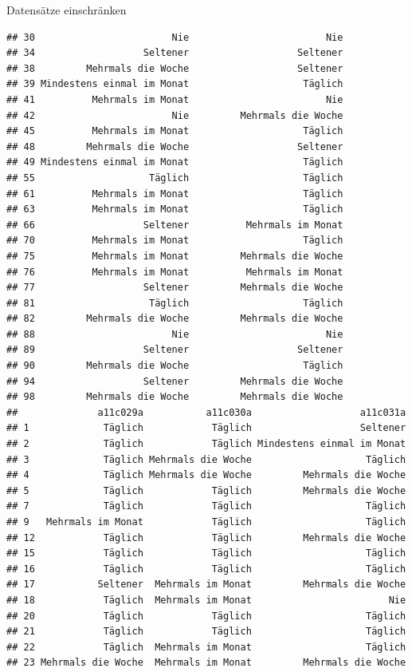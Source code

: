 \documentclass[ignorenonframetext,]{beamer}
\begin{document}
\begin{frame}[fragile]{Datensätze einschränken}
\begin{verbatim}
## 30                        Nie                        Nie
## 34                   Seltener                   Seltener
## 38         Mehrmals die Woche                   Seltener
## 39 Mindestens einmal im Monat                    Täglich
## 41          Mehrmals im Monat                        Nie
## 42                        Nie         Mehrmals die Woche
## 45          Mehrmals im Monat                    Täglich
## 48         Mehrmals die Woche                   Seltener
## 49 Mindestens einmal im Monat                    Täglich
## 55                    Täglich                    Täglich
## 61          Mehrmals im Monat                    Täglich
## 63          Mehrmals im Monat                    Täglich
## 66                   Seltener          Mehrmals im Monat
## 70          Mehrmals im Monat                    Täglich
## 75          Mehrmals im Monat         Mehrmals die Woche
## 76          Mehrmals im Monat          Mehrmals im Monat
## 77                   Seltener         Mehrmals die Woche
## 81                    Täglich                    Täglich
## 82         Mehrmals die Woche         Mehrmals die Woche
## 88                        Nie                        Nie
## 89                   Seltener                   Seltener
## 90         Mehrmals die Woche                    Täglich
## 94                   Seltener         Mehrmals die Woche
## 98         Mehrmals die Woche         Mehrmals die Woche
##              a11c029a           a11c030a                   a11c031a
## 1             Täglich            Täglich                   Seltener
## 2             Täglich            Täglich Mindestens einmal im Monat
## 3             Täglich Mehrmals die Woche                    Täglich
## 4             Täglich Mehrmals die Woche         Mehrmals die Woche
## 5             Täglich            Täglich         Mehrmals die Woche
## 7             Täglich            Täglich                    Täglich
## 9   Mehrmals im Monat            Täglich                    Täglich
## 12            Täglich            Täglich         Mehrmals die Woche
## 15            Täglich            Täglich                    Täglich
## 16            Täglich            Täglich                    Täglich
## 17           Seltener  Mehrmals im Monat         Mehrmals die Woche
## 18            Täglich  Mehrmals im Monat                        Nie
## 20            Täglich            Täglich                    Täglich
## 21            Täglich            Täglich                    Täglich
## 22            Täglich  Mehrmals im Monat                    Täglich
## 23 Mehrmals die Woche  Mehrmals im Monat         Mehrmals die Woche

\end{verbatim}
\end{frame}
\end{document}
